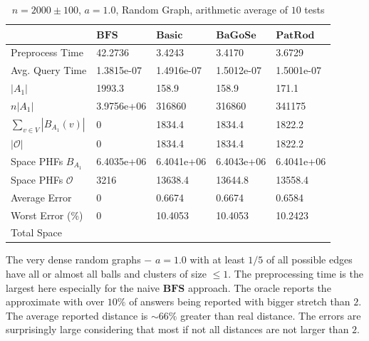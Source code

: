 \documentclass[shortabstract, lic, english]{iithesis}
\theoremstyle{definition} \newtheorem{definition}{Definition}[chapter]
\theoremstyle{plain} \newtheorem{remark}[definition]{Observation}
\theoremstyle{plain} \newtheorem{theorem}[definition]{Theorem}
\theoremstyle{plain} \newtheorem{lemma}[definition]{Lemma}
\theoremstyle{plain} \newtheorem{conjecture}[definition]{Conjecture}
\begin{document}
\begin{table}[H] \label{test:random.a10}
    \centering
    \begin{tabular}{ |p{3cm}||p{2cm}|p{2cm}|p{2cm}|p{2cm}|  } 
        \hline
        & $\mathbf{BFS}$ & $\mathbf{Basic}$ & $\mathbf{BaGoSe}$ & $\mathbf{PatRod}$ \\
        \hline
        \hline
        Preprocess Time                 & 42.2736    & 3.4243     & 3.4170      & 3.6729     \\
        \hline
        Avg. Query Time                 & 1.3815e-07 & 1.4916e-07 & 1.5012e-07  & 1.5001e-07 \\
        \hline
        $|A_1|$                         & 1993.3     & 158.9      & 158.9       & 171.1      \\
        \hline
        $n |A_1|$                       & 3.9756e+06 & 316860     & 316860      & 341175     \\
        \hline
        $\sum_{v \in V} |B_{A_1}(v)| $  & 0          & 1834.4     & 1834.4      & 1822.2     \\
        \hline
        $|\mathcal{O}|$                 & 0          & 1834.4     & 1834.4      & 1822.2     \\
        \hline
        Space PHFs $B_{A_1}$            & 6.4035e+06 & 6.4041e+06 & 6.4043e+06  & 6.4041e+06 \\
        \hline
        Space PHFs $\mathcal{O}$        & 3216       & 13638.4    & 13644.8     & 13558.4    \\
        \hline
        Average Error                   & 0          & 0.6674     & 0.6674      & 0.6584     \\
        \hline
        Worst Error (\%)                & 0          & 10.4053    & 10.4053     & 10.2423    \\
        \hline
        Total Space                     &            &            &             &            \\
        \hline

    \end{tabular}
    \caption{$n = 2000 \pm 100$, $a = 1.0$, Random Graph, arithmetic average of $10$ tests}
\end{table}

The very dense random graphs $-$ $a=1.0$ with at least $1/5$ of all possible edges have all or almost all balls and clusters of size $\leq 1$.
The preprocessing time is the largest here especially for the naive $\mathbf{BFS}$ approach.
The oracle reports the approximate with over $10\%$ of answers being reported with bigger stretch than $2$. The average reported distance is $\sim 66 \%$ greater than real distance.
The errors are surprisingly large considering that most if not all distances are not larger than $2$.
\end{document}

